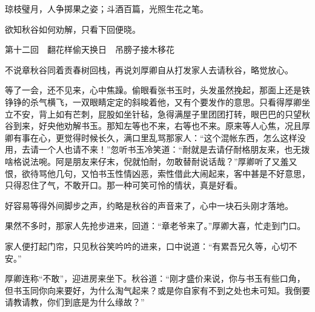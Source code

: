 \documentclass[12pt,UTF8]{ctexbook}
\begin{document}
{{{琼枝璧月，人争掷果之姿；斗酒百篇，光照生花之笔。

欲知秋谷如何劝解，只看下回便晓。





第十二回　翻花样偷天换日　吊膀子接木移花





不说章秋谷同着贡春树回栈，再说刘厚卿自从打发家人去请秋谷，略觉放心。

等了一会，还不见来，心中焦躁。偷眼看张书玉时，头发虽然挽起，那面上还是铁铮铮的杀气横飞，一双眼睛定定的斜睃着他，又有个要发作的意思。只看得厚卿坐立不安，背上如有芒刺，屁股如坐针毡，急得满屋子里团团打转，眼巴巴的只望秋谷到来，好央他劝解书玉。那知左等也不来，右等也不来。原来等人心焦，况且厚卿有事在心，更觉得时候长久，满口里乱骂那家人：“这个混帐东西，怎么这样没用，去请一个人也请不来！”忽听书玉冷笑道：“耐就是去请仔耐格朋友来，也无拨啥格说法啘。阿是朋友来仔末，倪就怕耐，勿敢替耐说话哉？”厚卿听了又羞又恨，欲待骂他几句，又怕书玉性情凶恶，索性借此大闹起来，客中甚是不好意思，只得忍住了气，不敢开口。那一种可笑可怜的情状，真是好看。

好容易等得外间脚步之声，约略是秋谷的声音来了，心中一块石头刚才落地。

果然不多时，那家人先抢步进来，回道：“章老爷来了。”厚卿大喜，忙走到门口。

家人便打起门帘，只见秋谷笑吟吟的进来，口中说道：“有累吾兄久等，心切不安。”

厚卿连称“不敢”，迎进房来坐下。秋谷道：“刚才盛价来说，你与书玉有些口角，但书玉同你向来要好，为什么淘气起来？或是你自家有不到之处也未可知。我倒要请教请教，你们到底是为什么缘故？”

}}}
\end{document}
